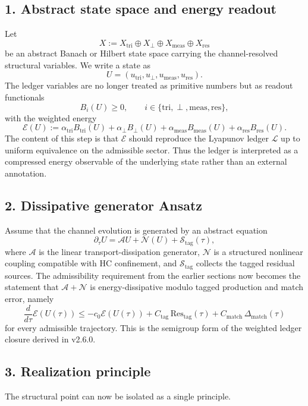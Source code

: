 \subsection*{1. Abstract state space and energy readout}
Let
\[
X := X_{\mathrm{tri}}\oplus X_{\perp}\oplus X_{\mathrm{meas}}\oplus X_{\mathrm{res}}
\]
be an abstract Banach or Hilbert state space carrying the channel-resolved structural
variables. We write a state as
\[
U=(u_{\mathrm{tri}},u_{\perp},u_{\mathrm{meas}},u_{\mathrm{res}}).
\]
The ledger variables are no longer treated as primitive numbers but as readout
functionals
\[
B_i(U)\ge 0,
\qquad i\in\{\mathrm{tri},\perp,\mathrm{meas},\mathrm{res}\},
\]
with the weighted energy
\[
\mathcal E(U):=\alpha_{\mathrm{tri}}B_{\mathrm{tri}}(U)
+\alpha_{\perp}B_{\perp}(U)
+\alpha_{\mathrm{meas}}B_{\mathrm{meas}}(U)
+\alpha_{\mathrm{res}}B_{\mathrm{res}}(U).
\]
The content of this step is that $\mathcal E$ should reproduce the Lyapunov ledger
$\mathcal L$ up to uniform equivalence on the admissible sector. Thus the ledger is
interpreted as a compressed energy observable of the underlying state rather than an
external annotation.

\subsection*{2. Dissipative generator Ansatz}
Assume that the channel evolution is generated by an abstract equation
\[
\partial_\tau U = \mathcal A U + \mathcal N(U) + \mathcal S_{\mathrm{tag}}(\tau),
\]
where $\mathcal A$ is the linear transport-dissipation generator, $\mathcal N$ is a
structured nonlinear coupling compatible with HC confinement, and
$\mathcal S_{\mathrm{tag}}$ collects the tagged residual sources. The admissibility
requirement from the earlier sections now becomes the statement that
$\mathcal A+\mathcal N$ is energy-dissipative modulo tagged production and match
error, namely
\[
\frac{d}{d\tau}\mathcal E(U(\tau))
\le -c_0\mathcal E(U(\tau))
+ C_{\mathrm{tag}}\,\mathrm{Res}_{\mathrm{tag}}(\tau)
+ C_{\mathrm{match}}\,\Delta_{\mathrm{match}}(\tau)
\]
for every admissible trajectory. This is the semigroup form of the weighted ledger
closure derived in v2.6.0.

\subsection*{3. Realization principle}
The structural point can now be isolated as a single principle.

